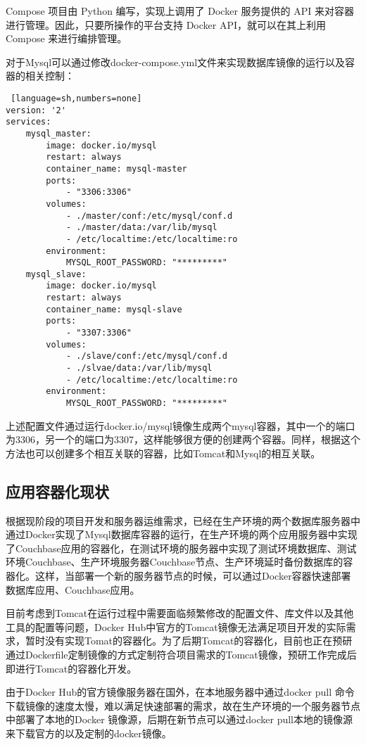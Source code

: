 Compose 项目由 Python 编写，实现上调用了 Docker 服务提供的 API 来对容器进行管理。因此，只要所操作的平台支持 Docker API，就可以在其上利用 Compose 来进行编排管理。

对于Mysql可以通过修改docker-compose.yml文件来实现数据库镜像的运行以及容器的相关控制：
\begin{lstlisting} [language=sh,numbers=none]
version: '2'
services:
    mysql_master:
        image: docker.io/mysql
        restart: always
        container_name: mysql-master
        ports:
            - "3306:3306"
        volumes:
            - ./master/conf:/etc/mysql/conf.d
            - ./master/data:/var/lib/mysql
            - /etc/localtime:/etc/localtime:ro
        environment:
            MYSQL_ROOT_PASSWORD: "*********"
    mysql_slave:
        image: docker.io/mysql
        restart: always
        container_name: mysql-slave
        ports:
            - "3307:3306"
        volumes:
            - ./slave/conf:/etc/mysql/conf.d
            - ./slvae/data:/var/lib/mysql
            - /etc/localtime:/etc/localtime:ro
        environment:
            MYSQL_ROOT_PASSWORD: "*********"
\end{lstlisting}
上述配置文件通过运行docker.io/mysql镜像生成两个mysql容器，其中一个的端口为3306，另一个的端口为3307，这样能够很方便的创建两个容器。同样，根据这个方法也可以创建多个相互关联的容器，比如Tomcat和Mysql的相互关联。

\subsection{应用容器化现状}
根据现阶段的项目开发和服务器运维需求，已经在生产环境的两个数据库服务器中通过Docker实现了Mysql数据库容器的运行，在生产环境的两个应用服务器中实现了Couchbase应用的容器化，在测试环境的服务器中实现了测试环境数据库、测试环境Couchbase、生产环境服务器Couchbase节点、生产环境延时备份数据库的容器化。这样，当部署一个新的服务器节点的时候，可以通过Docker容器快速部署数据库应用、Couchbase应用。

目前考虑到Tomcat在运行过程中需要面临频繁修改的配置文件、库文件以及其他工具的配置等问题，Docker Hub中官方的Tomcat镜像无法满足项目开发的实际需求，暂时没有实现Tomat的容器化。为了后期Tomcat的容器化，目前也正在预研通过Dockerfile定制镜像的方式定制符合项目需求的Tomcat镜像，预研工作完成后即进行Tomcat的容器化开发。

由于Docker Hub的官方镜像服务器在国外，在本地服务器中通过docker pull 命令下载镜像的速度太慢，难以满足快速部署的需求，故在生产环境的一个服务器节点中部署了本地的Docker 镜像源，后期在新节点可以通过docker pull本地的镜像源来下载官方的以及定制的docker镜像。

